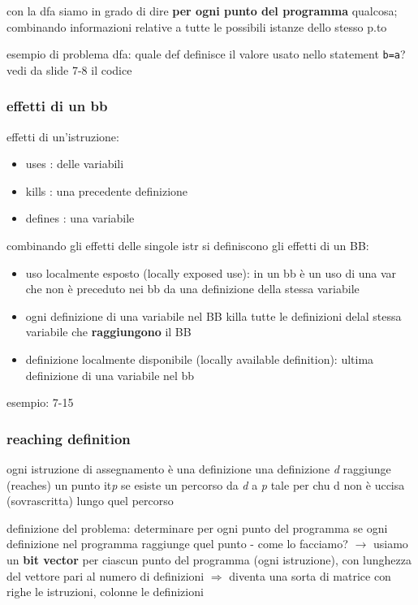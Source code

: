 con la dfa siamo in grado di dire \textbf{per ogni punto del programma} qualcosa; combinando informazioni relative a tutte le possibili istanze dello stesso p.to

esempio di problema dfa: quale def definisce il valore usato nello statement \lstinline|b=a|? vedi da slide 7-8 il codice

\subsubsection{effetti di un bb}

effetti di un'istruzione:
\begin{itemize}
  \item uses : delle variabili
  \item kills : una precedente definizione
  \item defines : una variabile
\end{itemize}
combinando gli effetti delle singole istr si definiscono gli effetti di un BB:
\begin{itemize}
  \item uso localmente esposto (locally exposed use): in un bb \`e un uso di una var che non \`e preceduto nei bb da una definizione della stessa variabile
  \item ogni definizione di una variabile nel BB killa tutte le definizioni delal stessa variabile che \textbf{raggiungono} il BB
  \item definizione localmente disponibile (locally available definition): ultima definizione di una variabile nel bb
\end{itemize}

esempio: 7-15

\subsubsection{reaching definition}

ogni istruzione di assegnamento \`e una definizione
una definizione \textit{d} raggiunge (reaches) un punto it\textit{p} se esiste un percorso da \textit{d} a \textit{p} tale per chu d non \`e uccisa (sovrascritta) lungo quel percorso

definizione del problema: determinare per ogni punto del programma se ogni definizione nel programma raggiunge quel punto - come lo facciamo? $\rightarrow$ usiamo un \textbf{bit vector} per ciascun punto del programma (ogni istruzione), con lunghezza del vettore pari al numero di definizioni $\Rightarrow$ diventa una sorta di matrice con righe le istruzioni, colonne le definizioni

